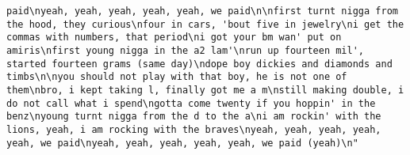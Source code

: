\documentclass[]{article}
\begin{document}
\begin{verbatim}
paid\nyeah, yeah, yeah, yeah, yeah, we paid\n\nfirst turnt nigga from the hood, they curious\nfour in cars, 'bout five in jewelry\ni get the commas with numbers, that period\ni got your bm wan' put on amiris\nfirst young nigga in the a2 lam'\nrun up fourteen mil', started fourteen grams (same day)\ndope boy dickies and diamonds and timbs\n\nyou should not play with that boy, he is not one of them\nbro, i kept taking l, finally got me a m\nstill making double, i do not call what i spend\ngotta come twenty if you hoppin' in the benz\nyoung turnt nigga from the d to the a\ni am rockin' with the lions, yeah, i am rocking with the braves\nyeah, yeah, yeah, yeah, yeah, we paid\nyeah, yeah, yeah, yeah, yeah, we paid (yeah)\n"                                                                                                                                                                                                                                                                                                                                                                                                                                                                                                                                                                                                                                                                                                                                                                                                                                                                                                                                                                                                                                                                                                                                                                                                                                                                                                                                                                                                                                                                                                                                                                                                                                                                                                                                                                                                                                                                                                                                                                                                                                                                                                                                                                                                                                                

\end{verbatim}
\end{document}
